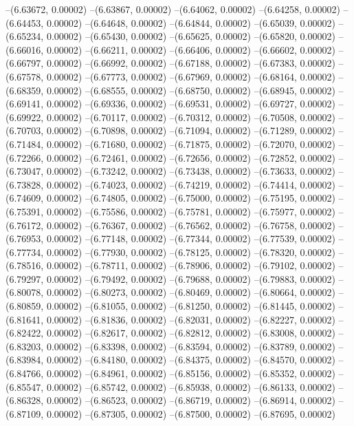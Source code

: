 --(6.63672, 0.00002)
--(6.63867, 0.00002)
--(6.64062, 0.00002)
--(6.64258, 0.00002)
--(6.64453, 0.00002)
--(6.64648, 0.00002)
--(6.64844, 0.00002)
--(6.65039, 0.00002)
--(6.65234, 0.00002)
--(6.65430, 0.00002)
--(6.65625, 0.00002)
--(6.65820, 0.00002)
--(6.66016, 0.00002)
--(6.66211, 0.00002)
--(6.66406, 0.00002)
--(6.66602, 0.00002)
--(6.66797, 0.00002)
--(6.66992, 0.00002)
--(6.67188, 0.00002)
--(6.67383, 0.00002)
--(6.67578, 0.00002)
--(6.67773, 0.00002)
--(6.67969, 0.00002)
--(6.68164, 0.00002)
--(6.68359, 0.00002)
--(6.68555, 0.00002)
--(6.68750, 0.00002)
--(6.68945, 0.00002)
--(6.69141, 0.00002)
--(6.69336, 0.00002)
--(6.69531, 0.00002)
--(6.69727, 0.00002)
--(6.69922, 0.00002)
--(6.70117, 0.00002)
--(6.70312, 0.00002)
--(6.70508, 0.00002)
--(6.70703, 0.00002)
--(6.70898, 0.00002)
--(6.71094, 0.00002)
--(6.71289, 0.00002)
--(6.71484, 0.00002)
--(6.71680, 0.00002)
--(6.71875, 0.00002)
--(6.72070, 0.00002)
--(6.72266, 0.00002)
--(6.72461, 0.00002)
--(6.72656, 0.00002)
--(6.72852, 0.00002)
--(6.73047, 0.00002)
--(6.73242, 0.00002)
--(6.73438, 0.00002)
--(6.73633, 0.00002)
--(6.73828, 0.00002)
--(6.74023, 0.00002)
--(6.74219, 0.00002)
--(6.74414, 0.00002)
--(6.74609, 0.00002)
--(6.74805, 0.00002)
--(6.75000, 0.00002)
--(6.75195, 0.00002)
--(6.75391, 0.00002)
--(6.75586, 0.00002)
--(6.75781, 0.00002)
--(6.75977, 0.00002)
--(6.76172, 0.00002)
--(6.76367, 0.00002)
--(6.76562, 0.00002)
--(6.76758, 0.00002)
--(6.76953, 0.00002)
--(6.77148, 0.00002)
--(6.77344, 0.00002)
--(6.77539, 0.00002)
--(6.77734, 0.00002)
--(6.77930, 0.00002)
--(6.78125, 0.00002)
--(6.78320, 0.00002)
--(6.78516, 0.00002)
--(6.78711, 0.00002)
--(6.78906, 0.00002)
--(6.79102, 0.00002)
--(6.79297, 0.00002)
--(6.79492, 0.00002)
--(6.79688, 0.00002)
--(6.79883, 0.00002)
--(6.80078, 0.00002)
--(6.80273, 0.00002)
--(6.80469, 0.00002)
--(6.80664, 0.00002)
--(6.80859, 0.00002)
--(6.81055, 0.00002)
--(6.81250, 0.00002)
--(6.81445, 0.00002)
--(6.81641, 0.00002)
--(6.81836, 0.00002)
--(6.82031, 0.00002)
--(6.82227, 0.00002)
--(6.82422, 0.00002)
--(6.82617, 0.00002)
--(6.82812, 0.00002)
--(6.83008, 0.00002)
--(6.83203, 0.00002)
--(6.83398, 0.00002)
--(6.83594, 0.00002)
--(6.83789, 0.00002)
--(6.83984, 0.00002)
--(6.84180, 0.00002)
--(6.84375, 0.00002)
--(6.84570, 0.00002)
--(6.84766, 0.00002)
--(6.84961, 0.00002)
--(6.85156, 0.00002)
--(6.85352, 0.00002)
--(6.85547, 0.00002)
--(6.85742, 0.00002)
--(6.85938, 0.00002)
--(6.86133, 0.00002)
--(6.86328, 0.00002)
--(6.86523, 0.00002)
--(6.86719, 0.00002)
--(6.86914, 0.00002)
--(6.87109, 0.00002)
--(6.87305, 0.00002)
--(6.87500, 0.00002)
--(6.87695, 0.00002)
